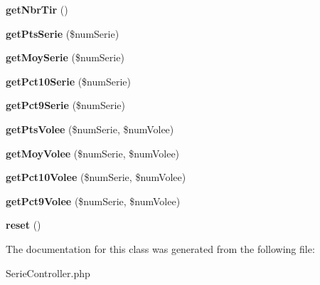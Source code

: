 \begin{DoxyCompactItemize}
{\bfseries get\+Nbr\+Tir} ()
\item 
\mbox{\label{class_serie_controller_a12a6d52d713d68f8aa8e81bc27ce76a4}} 
{\bfseries get\+Pts\+Serie} (\$num\+Serie)
\item 
\mbox{\label{class_serie_controller_a96ad8694dc6268ce79ec87c101aebe34}} 
{\bfseries get\+Moy\+Serie} (\$num\+Serie)
\item 
\mbox{\label{class_serie_controller_aad2e6ff2c6e915a22dbae27ac789cc46}} 
{\bfseries get\+Pct10\+Serie} (\$num\+Serie)
\item 
\mbox{\label{class_serie_controller_a82bd7e8dc7b182af5c5ce4a8511ec8f4}} 
{\bfseries get\+Pct9\+Serie} (\$num\+Serie)
\item 
\mbox{\label{class_serie_controller_ada4441f1feb14435bf5bd0a2aed92b3d}} 
{\bfseries get\+Pts\+Volee} (\$num\+Serie, \$num\+Volee)
\item 
\mbox{\label{class_serie_controller_a39f4e297c05cd090cc0b1d7ddf61b4b6}} 
{\bfseries get\+Moy\+Volee} (\$num\+Serie, \$num\+Volee)
\item 
\mbox{\label{class_serie_controller_a46e05ce3f3433e48ec8fabad7c5533da}} 
{\bfseries get\+Pct10\+Volee} (\$num\+Serie, \$num\+Volee)
\item 
\mbox{\label{class_serie_controller_a54368231203ac633d6f6b728f13fcb86}} 
{\bfseries get\+Pct9\+Volee} (\$num\+Serie, \$num\+Volee)
\item 
\mbox{\label{class_serie_controller_a4a20559544fdf4dcb457e258dc976cf8}} 
{\bfseries reset} ()
\end{DoxyCompactItemize}


The documentation for this class was generated from the following file\+:\begin{DoxyCompactItemize}
\item 
Serie\+Controller.\+php\end{DoxyCompactItemize}
